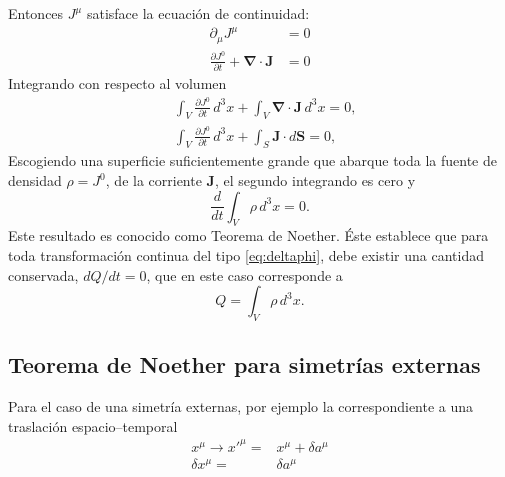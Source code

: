 Entonces $J^\mu$ satisface la ecuación de continuidad:
\begin{align}
  \label{eq:conti}
  \partial_\mu J^\mu&=0\\
\frac{\partial J^0}{\partial t}+\boldsymbol{\nabla}\cdot\mathbf{J}&=0
\end{align}
Integrando con respecto al volumen
\begin{align}
  &\int_V\frac{\partial J^0}{\partial t}\,d^3x+\int_V\boldsymbol{\nabla}\cdot\mathbf{J}\,d^3x=0,\nonumber\\
  &\int_V\frac{\partial J^0}{\partial t}\,d^3x+\int_S\mathbf{J}\cdot d\mathbf{S}=0,
\end{align}
Escogiendo una superficie suficientemente grande que abarque toda la fuente de densidad $\rho=J^0$, de la corriente $\mathbf{J}$, el segundo integrando es cero y
\begin{equation}
  \frac{d}{dt}\int_V\rho\,d^3x=0.
\end{equation}
Este resultado es conocido como Teorema de Noether. Éste establece que para
toda transformación continua del tipo \eqref{eq:deltaphi}, debe
existir una cantidad conservada, $dQ/dt=0$, que en este caso corresponde a
\begin{equation}
  \label{eq:qcons}
  Q=\int_V \rho\,d^3x.
\end{equation}


\subsection{Teorema de Noether para simetrías externas}
\label{sec:teorema-de-noether}
Para el caso de una simetría externas, por ejemplo la correspondiente a una traslación espacio--temporal
\begin{align}
  x^\mu\to{x'}^\mu=&x^\mu+\delta a^\mu\nonumber\\
  \delta x^\mu=&\delta a^\mu
\end{align}

